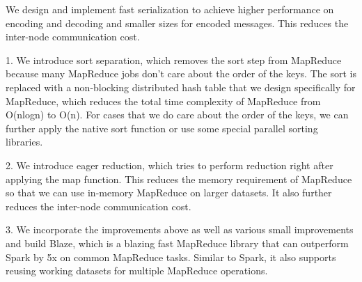 \documentclass{sigkddExp}
\begin{document}
We design and implement fast serialization to achieve higher performance on encoding and decoding and smaller sizes for encoded messages. This reduces the inter-node communication cost.

1. We introduce sort separation, which removes the sort step from MapReduce because many MapReduce jobs don't care about the order of the keys. The sort is replaced with a non-blocking distributed hash table that we design specifically for MapReduce, which reduces the total time complexity of MapReduce from O(nlogn) to O(n). For cases that we do care about the order of the keys, we can further apply the native sort function or use some special parallel sorting libraries.

2. We introduce eager reduction, which tries to perform reduction right after applying the map function. This reduces the memory requirement of MapReduce so that we can use in-memory MapReduce on larger datasets. It also further reduces the inter-node communication cost.

3. We incorporate the improvements above as well as various small improvements and build Blaze, which is a blazing fast MapReduce library that can outperform Spark by 5x on common MapReduce tasks. Similar to Spark, it also supports reusing working datasets for multiple MapReduce operations.
\end{document}
